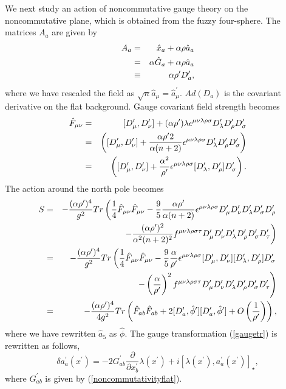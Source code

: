 \documentclass[a4paper,11pt]{article}
\begin{document}
We next study an action of noncommutative gauge theory 
on the noncommutative plane, which is obtained 
from the fuzzy four-sphere. 
The matrices $A_{a}$ are given by 
\begin{eqnarray}
A_{a}&=&\hat{x}_{a}+ \alpha \rho \hat{a}_{a} \cr 
&=&\alpha\hat{G}_{a}+ \alpha \rho \hat{a}_{a} \cr 
&\equiv& \alpha \rho^{\prime}D^{\prime}_{a}, 
\end{eqnarray} 
where we have rescaled the field as 
$\sqrt{n}\hat{a}_{\mu}=\hat{a}_{\mu}^{\prime}$. 
$Ad(D_{a})$ is the covariant derivative 
on the flat background. 
Gauge covariant field strength becomes 
\begin{eqnarray}
\hat{F}_{\mu\nu}&=&
[D_{\mu}^{\prime},D_{\nu}^{\prime}]
+(\alpha \rho^{\prime})\lambda
\epsilon^{\mu\nu\lambda\rho\sigma}
D_{\lambda}^{\prime}D_{\rho}^{\prime}D_{\sigma}^{\prime} \cr 
&=&
\left([D_{\mu}^{\prime},D_{\nu}^{\prime}]
+\frac{\alpha \rho^{\prime}2}{\alpha(n+2)}
\epsilon^{\mu\nu\lambda\rho\sigma}
D_{\lambda}^{\prime}D_{\rho}^{\prime}D_{\sigma}^{\prime}
\right) \cr 
&=&
\left([D_{\mu}^{\prime},D_{\nu}^{\prime}]
+\frac{\alpha^{2}}{\rho^{\prime}}
\epsilon^{\mu\nu\lambda\rho\sigma}
[D_{\lambda}^{\prime},D_{\rho}^{\prime}]D_{\sigma}^{\prime}
\right) . 
\end{eqnarray} 
The action around the north pole becomes 
\begin{eqnarray}
S&=&-\frac{(\alpha \rho^{\prime})^{4}}{g^{2}}Tr\left(
\frac{1}{4}\hat{F}_{\mu\nu}\hat{F}_{\mu\nu} 
-\frac{9}{5}\frac{\alpha \rho^{\prime}}{\alpha(n+2)}
\epsilon^{\mu\nu\lambda\rho\sigma}
D_{\mu}^{\prime}D_{\nu}^{\prime}D_{\lambda}^{\prime}
D_{\sigma}^{\prime}D_{\rho}^{\prime}
\right . \cr 
&&\left . \hspace{2cm} 
-
\frac{(\alpha \rho^{\prime})^{2}}{\alpha^{2}(n+2)^{2}}
f^{\mu\nu\lambda\rho\sigma\tau}
D_{\mu}^{\prime}D_{\nu}^{\prime}D_{\lambda}^{\prime}
D_{\rho}^{\prime}D_{\sigma}^{\prime}D_{\tau}^{\prime}
\right) \cr 
&=&-\frac{(\alpha \rho^{\prime})^{4}}{g^{2}}Tr\left(
\frac{1}{4}\hat{F}_{\mu\nu}\hat{F}_{\mu\nu}
-\frac{9}{5}
\frac{\alpha}{\rho^{\prime}}
\epsilon^{\mu\nu\lambda\rho\sigma}
[D_{\mu}^{\prime},D_{\nu}^{\prime}][D_{\lambda}^{\prime},
D_{\rho}^{\prime}]D_{\sigma}^{\prime}
\right . \cr 
&&\left . \hspace{2cm} 
-\left(\frac{\alpha}{\rho^{\prime}}\right)^{2}
f^{\mu\nu\lambda\rho\sigma\tau}
D_{\mu}^{\prime}D_{\nu}^{\prime}D_{\lambda}^{\prime}
D_{\rho}^{\prime}D_{\sigma}^{\prime}D_{\tau}^{\prime}
\right) \cr 
&=&-\frac{(\alpha \rho^{\prime})^{4}}{4g^{2}}Tr\left(
\hat{F}_{ab}\hat{F}_{ab}
+2[D_{a}^{\prime},\hat{\phi}^{\prime}]
[D_{a}^{\prime},\hat{\phi}^{\prime}]
+O\left( \frac{1}{\rho^{\prime}}\right)
\right),  
\end{eqnarray} 
where we have rewritten $\hat{a}_{5}$ as $\hat{\phi}$. 
The gauge transformation (\ref{gaugetr}) is rewritten as follows, 
\begin{equation} 
\delta a_{a}^{\prime}(x^{\prime}) =-2G_{ab}^{\prime}
\frac{\partial}{\partial x_{b}^{\prime}}\lambda(x^{\prime})
+i[\lambda(x^{\prime}),a_{a}^{\prime}(x^{\prime})]_{\star}, 
\end{equation}
where $G_{ab}^{\prime}$ is given by (\ref{noncommutativityflat}). 
\end{document}

